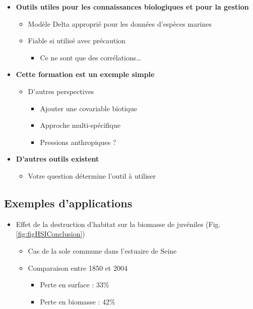 \documentclass[french,a4paper]{article}
\providecommand{\tightlist}{%
  \setlength{\itemsep}{0pt}\setlength{\parskip}{0pt}}
\begin{document}
\begin{itemize}
\tightlist
\item
  \textbf{Outils utiles pour les connaissances biologiques et pour la gestion}

  \begin{itemize}
  \tightlist
  \item
    Modèle Delta approprié pour les données d'espèces marines
  \item
    Fiable si utilisé avec précaution

    \begin{itemize}
    \tightlist
    \item
      Ce ne sont que des corrélations\ldots{}
    \end{itemize}
  \end{itemize}
\item
  \textbf{Cette formation est un exemple simple}

  \begin{itemize}
  \tightlist
  \item
    D'autres perspectives

    \begin{itemize}
    \tightlist
    \item
      Ajouter une covariable biotique
    \item
      Approche multi-spécifique
    \item
      Pressions anthropiques ?
    \end{itemize}
  \end{itemize}
\item
  \textbf{D'autres outils existent}

  \begin{itemize}
  \tightlist
  \item
    Votre question détermine l'outil à utiliser
  \end{itemize}
\end{itemize}

\hypertarget{exemples-dapplications}{%
\subsection{Exemples d'applications}\label{exemples-dapplications}}

\begin{itemize}
\tightlist
\item
  Effet de la destruction d'habitat sur la biomasse de juvéniles (Fig. \ref{fig:figHSIConclusion})

  \begin{itemize}
  \tightlist
  \item
    Cas de la sole commune dans l'estuaire de Seine
  \item
    Comparaison entre 1850 et 2004

    \begin{itemize}
    \tightlist
    \item
      Perte en surface : 33\%
    \item
      Perte en biomasse : 42\%
    \end{itemize}
  \end{itemize}
\end{itemize}
\end{document}
